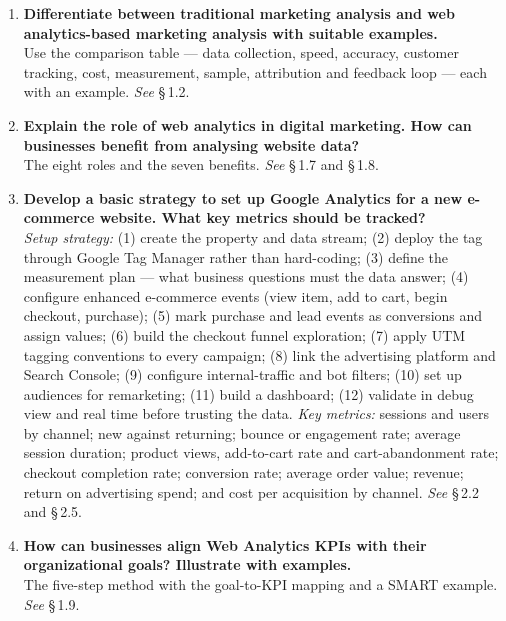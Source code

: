 \begin{enumerate}[leftmargin=2.2em,itemsep=1.4ex]

\item \textbf{Differentiate between traditional marketing analysis and web
      analytics-based marketing analysis with suitable examples.}
      \\
      Use the comparison table --- data collection, speed, accuracy, customer
      tracking, cost, measurement, sample, attribution and feedback loop --- each
      with an example. \hfill\emph{See} \S\,1.2.

\item \textbf{Explain the role of web analytics in digital marketing. How can
      businesses benefit from analysing website data?}
      \\
      The eight roles and the seven benefits. \hfill\emph{See} \S\,1.7 and
      \S\,1.8.

\item \textbf{Develop a basic strategy to set up Google Analytics for a new
      e-commerce website. What key metrics should be tracked?}
      \\
      \emph{Setup strategy:} (1) create the property and data stream; (2) deploy
      the tag through Google Tag Manager rather than hard-coding; (3) define the
      measurement plan --- what business questions must the data answer; (4)
      configure enhanced e-commerce events (view item, add to cart, begin
      checkout, purchase); (5) mark purchase and lead events as conversions and
      assign values; (6) build the checkout funnel exploration; (7) apply UTM
      tagging conventions to every campaign; (8) link the advertising platform
      and Search Console; (9) configure internal-traffic and bot filters; (10)
      set up audiences for remarketing; (11) build a dashboard; (12) validate in
      debug view and real time before trusting the data.
      \emph{Key metrics:} sessions and users by channel; new against returning;
      bounce or engagement rate; average session duration; product views,
      add-to-cart rate and cart-abandonment rate; checkout completion rate;
      conversion rate; average order value; revenue; return on advertising spend;
      and cost per acquisition by channel.
      \hfill\emph{See} \S\,2.2 and \S\,2.5.

\item \textbf{How can businesses align Web Analytics KPIs with their
      organizational goals? Illustrate with examples.}
      \\
      The five-step method with the goal-to-KPI mapping and a SMART example.
      \hfill\emph{See} \S\,1.9.


\end{enumerate}

